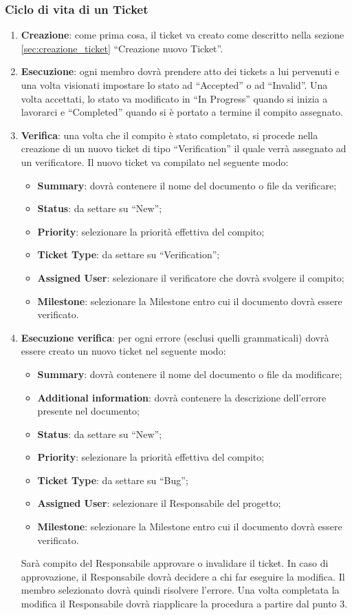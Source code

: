 \subsubsection{Ciclo di vita di un Ticket}
\label{sec:ciclo_vita_ticket}
\begin{enumerate}
\item \textbf{Creazione}: come prima cosa, il ticket va creato come descritto nella sezione \ref{sec:creazione_ticket} ``Creazione nuovo Ticket''.
\item \textbf{Esecuzione}: ogni membro dovrà prendere atto dei tickets a lui pervenuti e una volta visionati impostare lo stato ad ``Accepted'' o ad ``Invalid''. Una volta accettati, lo stato va modificato in ``In Progress'' quando si inizia a lavorarci e ``Completed'' quando si è portato a termine il compito assegnato.
\item \textbf{Verifica}: una volta che il compito è stato completato, si procede nella creazione di un nuovo ticket di tipo ``Verification'' il quale verrà assegnato ad un verificatore. Il nuovo ticket va compilato nel seguente modo:
\begin{itemize}
\item \textbf{Summary}: dovrà contenere il nome del documento o file da verificare;
\item \textbf{Status}: da settare su ``New'';
\item \textbf{Priority}: selezionare la priorità effettiva del compito;
\item \textbf{Ticket Type}: da settare su ``Verification'';
\item \textbf{Assigned User}: selezionare il verificatore che dovrà svolgere il compito;
\item \textbf{Milestone}: selezionare la Milestone entro cui il documento dovrà essere verificato.
\end{itemize}
\item \textbf{Esecuzione verifica}: per ogni errore (esclusi quelli grammaticali) dovrà essere creato un nuovo ticket nel seguente modo:
\begin{itemize}
\item \textbf{Summary}: dovrà contenere il nome del documento o file da modificare;
\item \textbf{Additional information}: dovrà contenere la descrizione dell'errore presente nel documento;
\item \textbf{Status}: da settare su ``New'';
\item \textbf{Priority}: selezionare la priorità effettiva del compito;
\item \textbf{Ticket Type}: da settare su ``Bug'';
\item \textbf{Assigned User}: selezionare il Responsabile del progetto;
\item \textbf{Milestone}: selezionare la Milestone entro cui il documento dovrà essere verificato.
\end{itemize}
Sarà  compito del Responsabile approvare o invalidare il ticket. In caso di approvazione, il Responsabile dovrà decidere a chi far eseguire la modifica. Il membro selezionato dovrà quindi risolvere l'errore. Una volta completata la modifica il Responsabile dovrà riapplicare la procedura a partire dal punto 3.
\end{enumerate}

